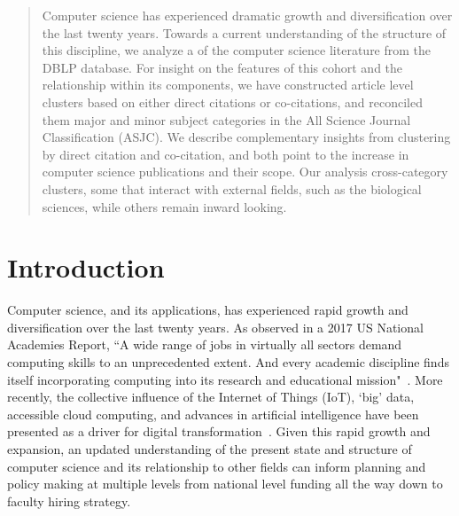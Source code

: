 \begin{abstract}
Computer science has experienced dramatic growth and diversification over the last twenty years. Towards a current understanding of the structure of this discipline, we analyze 
a  of the computer science literature from the DBLP database. For insight on the features of this cohort and the relationship within its components, we have constructed article 
level clusters based on either direct citations or co-citations, and reconciled them  major and minor subject categories in the All Science Journal Classification (ASJC). 
We describe complementary insights from clustering by direct citation and co-citation, and both point to the increase in computer science publications and their scope.
Our analysis  cross-category clusters, some that interact with external fields, such as the biological sciences, while others remain inward looking. 


\end{abstract}

\section{Introduction}
\label{intro}

Computer science, and its applications, has experienced rapid growth and diversification over the last twenty years. As observed in a 2017 US National Academies Report, ``A wide range of jobs in virtually all sectors demand computing skills to an unprecedented extent. And every academic discipline finds itself incorporating computing into its research and educational mission"~\cite{nas_2017}. More recently, the collective influence of the Internet of Things (IoT), `big' data, accessible cloud computing, and advances in artificial intelligence have been presented as a driver for digital transformation~\cite{siebel2019_digital}. Given this rapid growth and expansion, an updated understanding of the present state and structure of computer science and its relationship to other fields can inform planning and policy making at multiple levels from national level funding all the way down to faculty hiring strategy.

